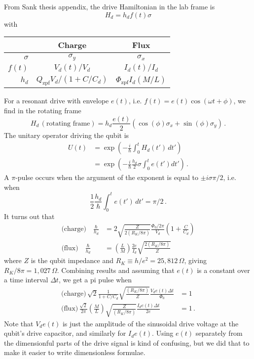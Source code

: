 From Sank thesis appendix, the drive Hamiltonian in the lab frame is
\begin{equation*}
  H_d = h_d f(t) \sigma
\end{equation*}
with
\begin{center}
  \begin{tabular}{r | c | c}
    & \textbf{Charge} & \textbf{Flux} \\
    \hline
    $\sigma$ & $\sigma_y$ & $\sigma_x$ \\
    \hline
    $f(t)$ & $V_d(t)/V_d$ & $I_d(t) / I_d$ \\
    \hline
    $h_d$ & $Q_\text{zpf} V_d/(1+C/C_d)$ & $\Phi_\text{zpf} I_d (M/L)$
  \end{tabular}
\end{center}
For a resonant drive with envelope $e(t)$, i.e. $f(t) = e(t) \cos(\omega t + \phi)$, we find in the rotating frame
\begin{equation*}
  H_d \, (\text{rotating frame}) = h_d \frac{e(t)}{2} \left( \cos(\phi) \sigma_x + \sin(\phi) \sigma_y \right) \, .
\end{equation*}
The unitary operator driving the qubit is
\begin{align*}
  U(t)
  &= \exp \left( -\frac{i}{\hbar} \int_0^t H_d(t') \, dt' \right) \\
  &= \exp \left( -\frac{i}{\hbar} \frac{h_d}{2} \sigma \int_0^t e(t') dt' \right) \, .
\end{align*}
A $\pi$-pulse occurs when the argument of the exponent is equal to $\pm i \sigma \pi / 2$, i.e. when
\begin{equation*}
  \frac{1}{2} \frac{h_d}{\hbar} \int_0^t e(t') \, dt' = \pi / 2 \, .
\end{equation*}
It turns out that
\begin{align*}
  \text{(charge)} \quad \frac{\hbar}{h_d} &=
  2 \sqrt{\frac{Z}{2 (R_K / 8\pi)}} \frac{\Phi_0/2\pi}{V_d} \left( 1 + \frac{C}{C_d} \right) \\
  \text{(flux)} \quad \frac{\hbar}{h_d} &=
  \left( \frac{L}{M} \right) \frac{2e}{I_d} \sqrt{\frac{2(R_K/8\pi)}{Z}}
\end{align*}
where $Z$ is the qubit impedance and $R_K \equiv h/e^2 = 25,812 \, \Omega$, giving $R_K/8\pi = 1,027 \, \Omega$.
Combining results and assuming that $e(t)$ is a constant over a time interval $\Delta t$,  we get a pi pulse when
\begin{align*}
  \text{(charge)} \, \sqrt{2} \frac{1}{1 + C/C_d} \sqrt{\frac{(R_K/8\pi)}{Z}} \frac{V_d e(t) \Delta t}{\Phi_0} &= 1 \\
  \text{(flux)} \, \frac{\sqrt{2}}{2 \pi} \left( \frac{M}{L} \right) \sqrt{\frac{Z}{(R_K/8\pi)}} \frac{I_d e(t) \Delta t}{2e} &= 1 \, .
\end{align*}
Note that $V_d e(t)$ is just the amplitude of the sinusoidal drive voltage at the qubit's drive capacitor, and similarly for $I_d e(t)$.
Using $e(t)$ separately from the dimensionful parts of the drive signal is kind of confusing, but we did that to make it easier to write dimensionless formulae.
